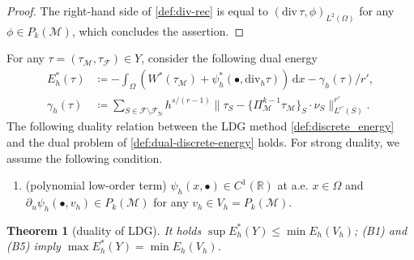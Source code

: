 \documentclass[a4paper]{amsart}
\numberwithin{equation}{section}
\renewcommand{\d}[1]{\,\mathrm{d}#1}
\renewcommand{\div}{\mathrm{div}}
\newcommand{\Mcal}{\mathcal{M}}
\newtheorem{theorem}{Theorem}[section]
\theoremstyle{remark}
\begin{document}
\begin{proof}
	The right-hand side of \eqref{def:div-rec} is equal to $(\div\, \tau, \phi)_{L^2(\Omega)}$ for any $\phi \in P_{k}(\Mcal)$, which concludes the assertion.
\end{proof}
For any $\tau = (\tau_\Mcal, \tau_\mathcal{F}) \in Y$, consider the following dual energy
\begin{align}\label{def:dual-discrete-energy}
	E^*_h(\tau) &\coloneqq - \int_\Omega (W^*(\tau_\Mcal) + \psi_h^*(\bullet,\div_h \tau)) \d{x} - \gamma_h(\tau)/r',\\
    \gamma_h(\tau) &\coloneqq \sum_{S \in \mathcal{F}\setminus\mathcal{F}_\mathrm{N}} h^{s/(r-1)} \|\tau_S - \{\Pi_\Mcal^{k-1} \tau_\Mcal\}_S \cdot \nu_S\|_{L^{r'}(S)}^{r'}.\label{def:dual-stab}
\end{align}
The following duality relation between the LDG method \eqref{def:discrete_energy} and the dual problem of \eqref{def:dual-discrete-energy} holds. For strong duality, we assume the following condition.
\begin{enumerate}[wide]
    \item[(B5)] (polynomial low-order term)
    $\psi_h(x,\bullet) \in C^1(\mathbb{R})$ at a.e. $x\in \Omega$ and $\partial_u \psi_h(\bullet,v_h) \in P_k(\Mcal)$ for any $v_h \in V_h = P_k(\Mcal)$.
\end{enumerate}
 

\begin{theorem}[duality of LDG]\label{thm:weak-duality}
	It holds $\sup E_h^*(Y) \leq \min E_h(V_h)$; (B1) and (B5) imply 
		$\max E_h^*(Y) = \min E_h(V_h)$.
\end{theorem}
\end{document}
